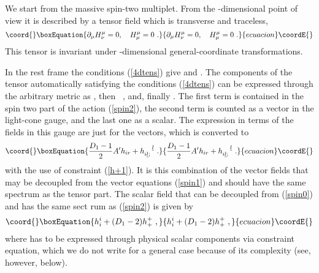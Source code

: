 \documentclass[a4paper,12pt]{article}
\begin{document}
We start from the massive spin-two multiplet. From the
\coordHE{}-dimensional point of view it is described by a tensor field
\coordHE{} which is transverse and traceless,
\begin{equation}\coord{}\boxEquation{
\partial_\mu H^\mu_\nu=0,~~~
H^\mu_\mu=0~.
\label{4dtens}
}{
\partial_\mu H^\mu_\nu=0,~~~
H^\mu_\mu=0~.
}{ecuacion}\coordE{}\end{equation}
This tensor is invariant under \coordHE{}-dimensional general-coordinate
transformations.

In the rest frame the conditions (\ref{4dtens}) give \coordHE{}
and \coordHE{}. The components of the tensor
\coordHE{} automatically satisfying the conditions (\ref{4dtens}) can
be expressed through the arbitrary metric as
\coordHE{}, then \coordHE{}~, and, finally
\coordHE{}. The first term is contained in the spin two part of
the action (\ref{spin2}), the second term is counted as a vector
in the light-cone gauge, and the last one as a scalar. The expression
in terms of the fields in this gauge are just \coordHE{} for the
vectors, which is converted to
\begin{equation}\coord{}\boxEquation{
\frac{D_1-1}{2} A'h_{ir}  + h_{i\underline l ;}^{\quad\underline l}~.
\label{grvect}
}{
\frac{D_1-1}{2} A'h_{ir}  + h_{i\underline l ;}^{\quad\underline l}~.
}{ecuacion}\coordE{}\end{equation}
with the use of constraint (\ref{h+1}). It is this combination of
the vector fields that may be decoupled from the vector equations
(\ref{spin1}) and should have the same spectrum as the tensor
part. The scalar field that can be decoupled from (\ref{spin0})
and has the same sect rum as (\ref{spin2}) is given by
\begin{equation}\coord{}\boxEquation{
h^i_i+(D_1-2)h^+_+~,
\label{grsc}
}{
h^i_i+(D_1-2)h^+_+~,
}{ecuacion}\coordE{}\end{equation}
where \coordHE{} has to be expressed through physical scalar components
via constraint equation, which we do not write for a general case
because of its complexity (see, however, below).
\end{document}
